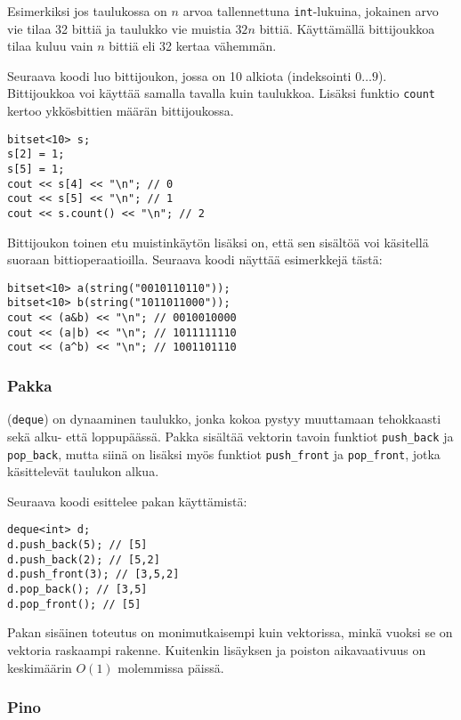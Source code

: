 Esimerkiksi jos taulukossa on $n$ arvoa
tallennettuna \texttt{int}-lukuina,
jokainen arvo vie tilaa 32 bittiä ja taulukko
vie muistia $32n$ bittiä.
Käyttämällä bittijoukkoa tilaa
kuluu vain $n$ bittiä eli 32 kertaa vähemmän.

Seuraava koodi luo bittijoukon, jossa on 10 alkiota
(indeksointi $0 \ldots 9$).
Bittijoukkoa voi käyttää samalla tavalla kuin taulukkoa.
Lisäksi funktio \texttt{count} kertoo ykkösbittien
määrän bittijoukossa.
\begin{lstlisting}
bitset<10> s;
s[2] = 1;
s[5] = 1;
cout << s[4] << "\n"; // 0
cout << s[5] << "\n"; // 1
cout << s.count() << "\n"; // 2
\end{lstlisting}

Bittijoukon toinen etu muistinkäytön lisäksi on,
että sen sisältöä voi käsitellä suoraan bittioperaatioilla.
Seuraava koodi näyttää esimerkkejä tästä:

\begin{lstlisting}
bitset<10> a(string("0010110110"));
bitset<10> b(string("1011011000"));
cout << (a&b) << "\n"; // 0010010000
cout << (a|b) << "\n"; // 1011111110
cout << (a^b) << "\n"; // 1001101110
\end{lstlisting}

\subsubsection{Pakka}


 (\texttt{deque}) on dynaaminen taulukko,
jonka kokoa pystyy muuttamaan tehokkaasti
sekä alku- että loppupäässä.
Pakka sisältää vektorin tavoin
funktiot \texttt{push\_back}
ja \texttt{pop\_back}, mutta siinä on lisäksi myös funktiot
\texttt{push\_front} ja \texttt{pop\_front},
jotka käsittelevät taulukon alkua.

Seuraava koodi esittelee pakan käyttämistä:

\begin{lstlisting}
deque<int> d;
d.push_back(5); // [5]
d.push_back(2); // [5,2]
d.push_front(3); // [3,5,2]
d.pop_back(); // [3,5]
d.pop_front(); // [5]
\end{lstlisting}

Pakan sisäinen toteutus on monimutkaisempi kuin
vektorissa, minkä vuoksi se on
vektoria raskaampi rakenne.
Kuitenkin lisäyksen ja poiston
aikavaativuus on keskimäärin $O(1)$ molemmissa päissä.

\subsubsection{Pino}

